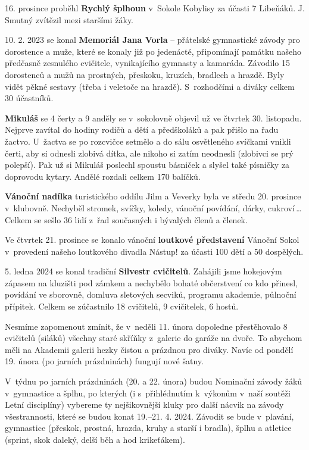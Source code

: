 \documentclass[11pt]{article}
\begin{document}
16. prosince proběhl \textbf{Rychlý šplhoun} v~Sokole Kobylisy za účasti 7 Libeňáků. J. Smutný zvítězil mezi staršími žáky.

10. 2. 2023 se konal \textbf{Memoriál Jana Vorla} – přátelské gymnastické závody pro dorostence a muže, které se konaly již po jedenácté, připomínají památku našeho předčasně zesnulého cvičitele, vynikajícího gymnasty a kamaráda. Závodilo 15 dorostenců a mužů na prostných, přeskoku, kruzích, bradlech a hrazdě. Byly vidět pěkné sestavy (třeba i veletoče na hrazdě). S~rozhodčími a diváky celkem 30 účastníků.

\clearpage
\vspace*{-48pt}
\textbf{Mikuláš} se 4 čerty a 9 anděly se v~sokolovně objevil už ve čtvrtek 30. listopadu. Nejprve zavítal do hodiny rodičů a dětí a předškoláků a pak přišlo na řadu žactvo. U~žactva se po rozcvičce setmělo a do sálu osvětleného svíčkami vnikli čerti, aby si odnesli zlobivá dítka, ale nikoho si zatím neodnesli (zlobivci se prý polepší). Pak už si Mikuláš poslechl spoustu básniček a slyšel také písničky za doprovodu kytary. Andělé rozdali celkem 170 balíčků.

\textbf{Vánoční nadílka} turistického oddílu Jilm a Veverky byla ve středu 20. prosince v~klubovně. Nechyběl stromek, svíčky, koledy, vánoční povídání, dárky, cukroví\,\dots{} Celkem se sešlo 36 lidí z~řad současných i bývalých členů a členek.

Ve čtvrtek 21. prosince se konalo vánoční \textbf{loutkové představení} Vánoční Sokol v~provedení našeho loutkového divadla Nástup! za účasti 100 dětí a 50 dospělých.

5. ledna 2024 se konal tradiční \textbf{Silvestr cvičitelů}. Zahájili jsme hokejovým zápasem na kluzišti pod zámkem a nechybělo bohaté občerstvení \luv{}co kdo přinesl\ruv{}, povídání ve sborovně, domluva sletových secviků, programu akademie, půlnoční přípitek. Celkem se zúčastnilo 18 cvičitelů, 9 cvičitelek, 6 hostů.

Nesmíme zapomenout zmínit, že v~neděli 11. února dopoledne přestěhovalo 8 cvičitelů (siláků) všechny staré skříňky z~galerie do garáže na dvoře. To abychom měli na Akademii galerii hezky čistou a prázdnou pro diváky. Navíc od pondělí 19. února (po jarních prázdninách) fungují nové šatny.

V~týdnu po jarních prázdninách (20. a 22. února) budou Nominační závody žáků v~gymnastice a šplhu, po kterých (i s~přihlédnutím k~výkonům v~naší soutěži Letní disciplíny) vybereme ty nejšikovnější kluky pro další nácvik na závody všestrannosti, které se budou konat 19.–21. 4. 2024. Závodit se bude v~plavání, gymnastice (přeskok, prostná, hrazda, kruhy a starší i bradla), šplhu a atletice (sprint, skok daleký, delší běh a hod krikeťákem).     
\end{document}
